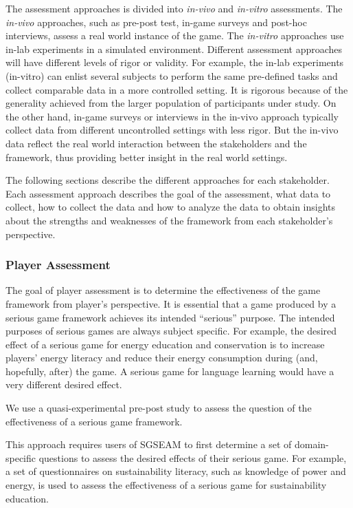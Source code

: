 The assessment approaches is divided into {\em in-vivo} and {\em in-vitro} assessments. The {\em in-vivo} approaches, 
such as pre-post test, in-game surveys and post-hoc interviews, assess a real world instance of the game. 
The {\em in-vitro} approaches use in-lab experiments in a simulated environment. Different assessment
approaches will have different levels of rigor or validity. For example, the in-lab experiments (in-vitro) can 
enlist several subjects to perform the same pre-defined tasks and collect comparable data in a more 
controlled setting. It is rigorous because of the generality achieved from the larger population of
participants under study. On the other hand, in-game surveys or interviews in the in-vivo approach typically 
collect data from different uncontrolled settings with less rigor. But the in-vivo data reflect the real world 
interaction between the stakeholders and the framework, thus providing better insight in the real world settings.

The following sections describe the different approaches for each stakeholder.  Each assessment 
approach describes the goal of the assessment, what data to collect, how to collect the data and how to 
analyze the data to obtain insights about the strengths and weaknesses of the framework from each 
stakeholder's perspective.

\subsubsection{Player Assessment}

The goal of player assessment is to determine the effectiveness of the game
framework from player's perspective. It is essential that a game produced by a serious game
framework achieves its intended ``serious'' purpose. The intended purposes of serious games are
always subject specific. For example, the desired effect of a serious game for
energy education and conservation is to increase players' energy literacy and
reduce their energy consumption during (and, hopefully, after) the game. A serious game for
language learning would have a very different desired effect.

\label{Pre-Post effectiveness study}

We use a quasi-experimental pre-post study to assess the question of the effectiveness of a serious game framework. 

This approach requires users of SGSEAM to first determine a set of domain-specific questions to assess the 
desired effects of their serious game. For example, a set of questionnaires on sustainability literacy, such as 
knowledge of power and energy, is used to assess the effectiveness of a serious game for sustainability education.

